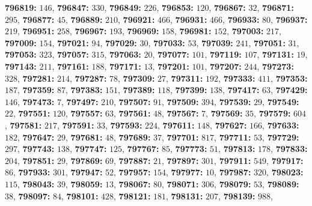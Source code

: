 \textsf{\bfseries 796819:} $146$, \textsf{\bfseries 796847:} $330$, \textsf{\bfseries 796849:} $226$, \textsf{\bfseries 796853:} $120$, \textsf{\bfseries 796867:} $32$, \textsf{\bfseries 796871:} $295$, \textsf{\bfseries 796877:} $45$, \textsf{\bfseries 796889:} $210$, \textsf{\bfseries 796921:} $466$, \textsf{\bfseries 796931:} $466$, \textsf{\bfseries 796933:} $80$, \textsf{\bfseries 796937:} $219$, \textsf{\bfseries 796951:} $258$, \textsf{\bfseries 796967:} $193$, \textsf{\bfseries 796969:} $158$, \textsf{\bfseries 796981:} $152$, \textsf{\bfseries 797003:} $217$, \textsf{\bfseries 797009:} $154$, \textsf{\bfseries 797021:} $94$, \textsf{\bfseries 797029:} $30$, \textsf{\bfseries 797033:} $53$, \textsf{\bfseries 797039:} $241$, \textsf{\bfseries 797051:} $31$, \textsf{\bfseries 797053:} $323$, \textsf{\bfseries 797057:} $315$, \textsf{\bfseries 797063:} $20$, \textsf{\bfseries 797077:} $101$, \textsf{\bfseries 797119:} $107$, \textsf{\bfseries 797131:} $19$, \textsf{\bfseries 797143:} $211$, \textsf{\bfseries 797161:} $188$, \textsf{\bfseries 797171:} $13$, \textsf{\bfseries 797201:} $101$, \textsf{\bfseries 797207:} $244$, \textsf{\bfseries 797273:} $328$, \textsf{\bfseries 797281:} $214$, \textsf{\bfseries 797287:} $78$, \textsf{\bfseries 797309:} $27$, \textsf{\bfseries 797311:} $192$, \textsf{\bfseries 797333:} $411$, \textsf{\bfseries 797353:} $187$, \textsf{\bfseries 797359:} $87$, \textsf{\bfseries 797383:} $151$, \textsf{\bfseries 797389:} $118$, \textsf{\bfseries 797399:} $138$, \textsf{\bfseries 797417:} $63$, \textsf{\bfseries 797429:} $146$, \textsf{\bfseries 797473:} $7$, \textsf{\bfseries 797497:} $210$, \textsf{\bfseries 797507:} $91$, \textsf{\bfseries 797509:} $394$, \textsf{\bfseries 797539:} $29$, \textsf{\bfseries 797549:} $22$, \textsf{\bfseries 797551:} $120$, \textsf{\bfseries 797557:} $63$, \textsf{\bfseries 797561:} $48$, \textsf{\bfseries 797567:} $7$, \textsf{\bfseries 797569:} $35$, \textsf{\bfseries 797579:} $604$, \textsf{\bfseries 797581:} $217$, \textsf{\bfseries 797591:} $33$, \textsf{\bfseries 797593:} $224$, \textsf{\bfseries 797611:} $148$, \textsf{\bfseries 797627:} $166$, \textsf{\bfseries 797633:} $182$, \textsf{\bfseries 797647:} $29$, \textsf{\bfseries 797681:} $48$, \textsf{\bfseries 797689:} $37$, \textsf{\bfseries 797701:} $817$, \textsf{\bfseries 797711:} $53$, \textsf{\bfseries 797729:} $297$, \textsf{\bfseries 797743:} $138$, \textsf{\bfseries 797747:} $125$, \textsf{\bfseries 797767:} $85$, \textsf{\bfseries 797773:} $51$, \textsf{\bfseries 797813:} $178$, \textsf{\bfseries 797833:} $204$, \textsf{\bfseries 797851:} $29$, \textsf{\bfseries 797869:} $69$, \textsf{\bfseries 797887:} $21$, \textsf{\bfseries 797897:} $301$, \textsf{\bfseries 797911:} $549$, \textsf{\bfseries 797917:} $86$, \textsf{\bfseries 797933:} $301$, \textsf{\bfseries 797947:} $52$, \textsf{\bfseries 797957:} $154$, \textsf{\bfseries 797977:} $10$, \textsf{\bfseries 797987:} $320$, \textsf{\bfseries 798023:} $115$, \textsf{\bfseries 798043:} $39$, \textsf{\bfseries 798059:} $13$, \textsf{\bfseries 798067:} $80$, \textsf{\bfseries 798071:} $306$, \textsf{\bfseries 798079:} $53$, \textsf{\bfseries 798089:} $38$, \textsf{\bfseries 798097:} $84$, \textsf{\bfseries 798101:} $428$, \textsf{\bfseries 798121:} $181$, \textsf{\bfseries 798131:} $207$, \textsf{\bfseries 798139:} $988$, 
